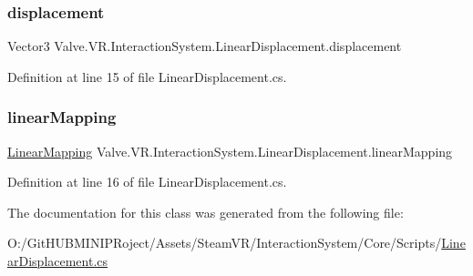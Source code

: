 \subsubsection{\texorpdfstring{displacement}{displacement}}
{\footnotesize\ttfamily Vector3 Valve.\+V\+R.\+Interaction\+System.\+Linear\+Displacement.\+displacement}



Definition at line 15 of file Linear\+Displacement.\+cs.

\mbox{\label{class_valve_1_1_v_r_1_1_interaction_system_1_1_linear_displacement_ab9cbfa64032477d68ee302a6f1184430}} 
\subsubsection{\texorpdfstring{linearMapping}{linearMapping}}
{\footnotesize\ttfamily \mbox{\hyperlink{class_valve_1_1_v_r_1_1_interaction_system_1_1_linear_mapping}{Linear\+Mapping}} Valve.\+V\+R.\+Interaction\+System.\+Linear\+Displacement.\+linear\+Mapping}



Definition at line 16 of file Linear\+Displacement.\+cs.



The documentation for this class was generated from the following file\+:\begin{DoxyCompactItemize}
\item 
O\+:/\+Git\+H\+U\+B\+M\+I\+N\+I\+P\+Roject/\+Assets/\+Steam\+V\+R/\+Interaction\+System/\+Core/\+Scripts/\mbox{\hyperlink{_linear_displacement_8cs}{Linear\+Displacement.\+cs}}\end{DoxyCompactItemize}
